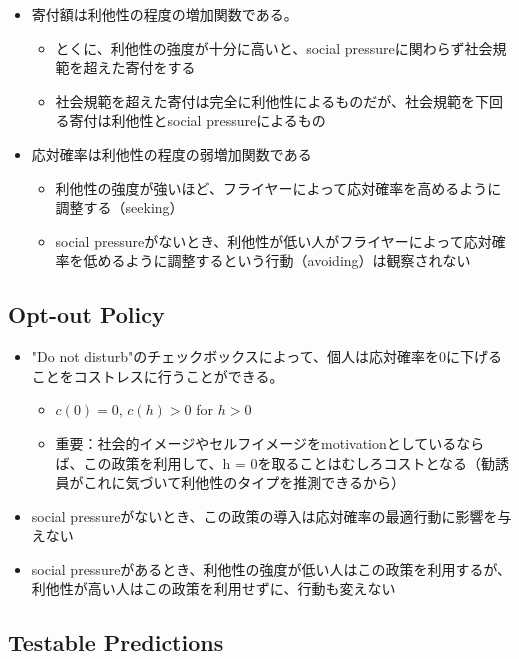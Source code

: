 \documentclass[../root]{subfiles}
\begin{document}
    \begin{itemize}
        \item 寄付額は利他性の程度の増加関数である。
        \begin{itemize}
            \item とくに、利他性の強度が十分に高いと、social pressureに関わらず社会規範を超えた寄付をする
            \item 社会規範を超えた寄付は完全に利他性によるものだが、社会規範を下回る寄付は利他性とsocial pressureによるもの
        \end{itemize}
        \item 応対確率は利他性の程度の弱増加関数である
        \begin{itemize}
            \item 利他性の強度が強いほど、フライヤーによって応対確率を高めるように調整する（seeking）
            \item social pressureがないとき、利他性が低い人がフライヤーによって応対確率を低めるように調整するという行動（avoiding）は観察されない
        \end{itemize}
    \end{itemize}

    \subsection{Opt-out Policy}

    \begin{itemize}
        \item "Do not disturb"のチェックボックスによって、個人は応対確率を0に下げることをコストレスに行うことができる。
        \begin{itemize}
            \item $c(0) = 0$, $c(h) > 0$ for $h > 0$
            \item 重要：社会的イメージやセルフイメージをmotivationとしているならば、この政策を利用して、h = 0を取ることはむしろコストとなる（勧誘員がこれに気づいて利他性のタイプを推測できるから）
        \end{itemize}
        \item social pressureがないとき、この政策の導入は応対確率の最適行動に影響を与えない
        \item social pressureがあるとき、利他性の強度が低い人はこの政策を利用するが、利他性が高い人はこの政策を利用せずに、行動も変えない
    \end{itemize}

    \subsection{Testable Predictions}
\end{document}
